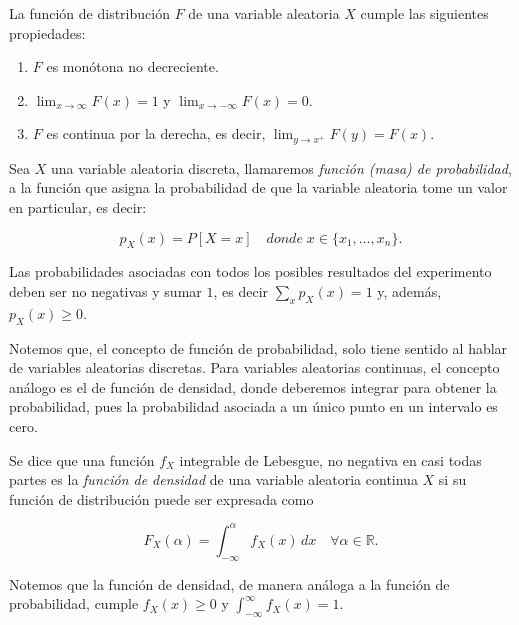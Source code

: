 \begin{proposicion}
    La función de distribución $F$ de una variable aleatoria $X$ cumple las siguientes propiedades:

    \begin{enumerate}
        \item $F$ es monótona no decreciente.
        \item $\lim_{x \to \infty} F(x) = 1$ y $\lim_{x \to -\infty} F(x) = 0$.
        \item $F$ es continua por la derecha, es decir, $\lim_{y \to x^+} F(y) = F(x)$.
    \end{enumerate}
\end{proposicion}

\begin{definicion}\label{def:funcion-de-probabilidad}
    Sea $X$ una variable aleatoria discreta, llamaremos \emph{función (masa) de probabilidad}, a la función que asigna la probabilidad de que la variable aleatoria tome un valor en particular, es decir:

    \[ p_X(x) = P[X = x] \quad donde \; x \in \{x_1, \ldots, x_n\}. \]
\end{definicion}

Las probabilidades asociadas con todos los posibles resultados del experimento deben ser no negativas y sumar $1$, es decir $ \sum_x p_X(x) = 1 $ y, además, $p_X(x) \ge 0$.

Notemos que, el concepto de función de probabilidad, solo tiene sentido al hablar de variables aleatorias discretas. Para variables aleatorias continuas, el concepto análogo es el de función de densidad, donde deberemos integrar para obtener la probabilidad, pues la probabilidad asociada a un único punto en un intervalo es cero.

\begin{definicion}\label{def:funcion-de-densidad}
    Se dice que una función $f_X$ integrable de Lebesgue, no negativa en casi todas partes es la \emph{función de densidad} de una variable aleatoria continua $X$ si su función de distribución puede ser expresada como

    \[ F_X(\alpha) =  \int_{-\infty}^{\alpha} f_X(x) \, dx \quad \forall \alpha \in \mathbb{R}. \]
\end{definicion}

Notemos que la función de densidad, de manera análoga a la función de probabilidad, cumple $ f_X(x) \ge 0$ y $ \int_{-\infty}^{\infty} f_X(x) = 1$.

